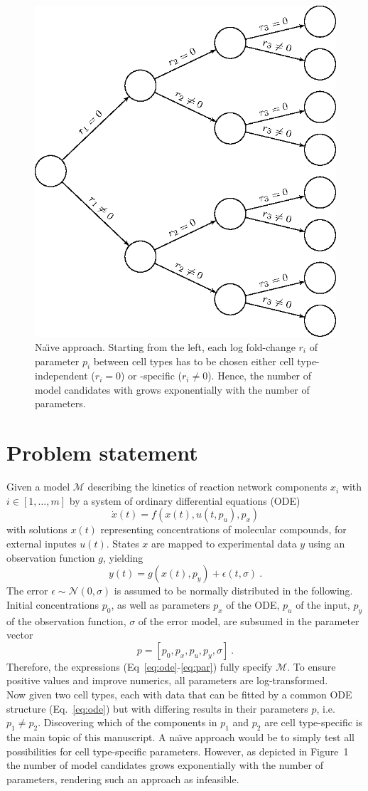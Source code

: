 \documentclass{bioinfo}
\begin{document}
\begin{figure}[!tpb]%
\centerline{\includegraphics[width=.35\textwidth]{Figures/tree.eps}}
\caption{Na\"{\i}ve approach. Starting from the left, each log fold-change $r_i$ of parameter $p_i$ between cell types has to be chosen either cell type-independent ($r_i=0$) or -specific ($r_i\neq 0$). Hence, the number of model candidates with grows exponentially with the number of parameters.}\label{fig:01}
\end{figure}

\section{Problem statement}

Given a model $\mathcal M$ describing the kinetics of reaction network components $x_i$ with $i \in [1,\dots,m]$ by a system of ordinary differential equations (ODE)
\begin{equation}
\dot x(t) = f(x(t),u(t,p_u),p_x)\label{eq:ode}
\end{equation}
with solutions $x(t)$ representing concentrations of molecular compounds, for external inputes $u(t)$.
States $x$ are mapped to experimental data $y$ using an observation function $g$, yielding
\begin{equation}
y(t) = g(x(t),p_y)+\epsilon(t,\sigma) \:.\label{eq:obs}
\end{equation}
The error $\epsilon \sim \mathcal N(0,\sigma)$ is assumed to be normally distributed in the following.
Initial concentrations $p_0$, as well as parameters $p_x$ of the ODE, $p_u$ of the input, $p_y$ of the observation function, $\sigma$ of the error model, are subsumed in the parameter vector
\begin{equation}
p = [p_0, p_x, p_u, p_y, \sigma] \:.\label{eq:par}
\end{equation}
Therefore, the expressions (Eq~\ref{eq:ode}-\ref{eq:par}) fully specify $\mathcal M$.
To ensure positive values and improve numerics, all parameters are log-transformed.\\
Now given two cell types, each with data that can be fitted by a common ODE structure (Eq.~\ref{eq:ode}) but with differing results in their parameters $p$, i.e. $p_1 \neq p_2$.
Discovering which of the components in $p_1$ and $p_2$ are cell type-specific is the main topic of this manuscript.
A na\"{\i}ve approach would be to simply test all possibilities for cell type-specific parameters.
However, as depicted in Figure~1\vphantom{\ref{fig:01}} the number of model candidates grows exponentially with the number of parameters, rendering such an approach as infeasible.
\end{document}
